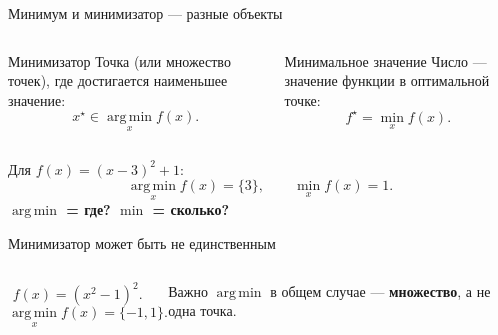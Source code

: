\documentclass[aspectratio=169,10pt]{beamer}
\newcommand{\argmin}{\operatorname*{arg\,min}}
\begin{document}
\begin{frame}{Минимум и минимизатор --- разные объекты}
\begin{columns}[T,onlytextwidth]
\begin{block}{Минимизатор}
Точка (или множество точек), где достигается наименьшее значение:
\[
  x^\star\in\argmin_x f(x).
\]
\end{block}
\begin{block}{Минимальное значение}
Число --- значение функции в оптимальной точке:
\[
  f^\star=\min_x f(x).
\]
\end{block}
\end{columns}
\vspace{1em}
Для $f(x)=(x-3)^2+1$:
\[
  \argmin_x f(x)=\{3\},\qquad \min_x f(x)=1.
\]
\vfill
\centering
\Large\textbf{$\argmin$ = где? \qquad $\min$ = сколько?}
\end{frame}

\begin{frame}{Минимизатор может быть не единственным}
\begin{columns}[T,onlytextwidth]
\[
  f(x)=(x^2-1)^2.
\]
\[
  \argmin_x f(x)=\{-1,1\}.
\]

\begin{alertblock}{Важно}
$\argmin$ в общем случае --- \textbf{множество}, а не одна точка.
\end{alertblock}
\end{columns}
\end{frame}
\end{document}
